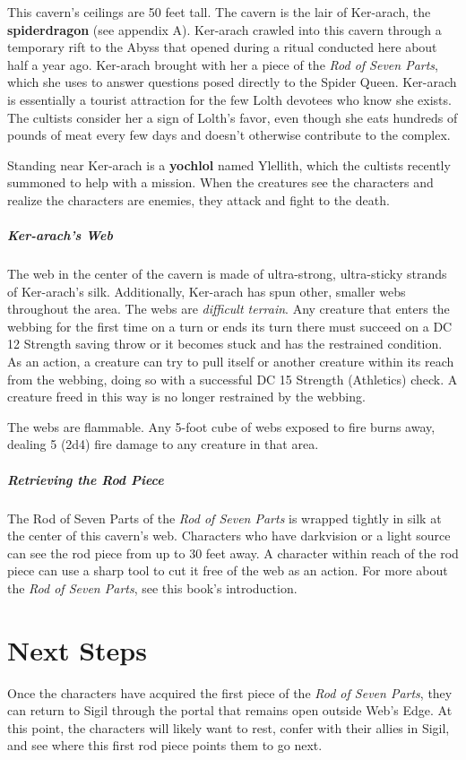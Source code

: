 \documentclass[10pt,a4paper,twoside,bg=print,twocolumn,openany,nodeprecatedcode]{dndbook}
\begin{document}
This cavern's ceilings are 50 feet tall. The cavern is the lair of Ker-arach, the \textbf{spiderdragon} (see appendix A). Ker-arach crawled into this cavern through a temporary rift to the Abyss that opened during a ritual conducted here about half a year ago. Ker-arach brought with her a piece of the \textit{Rod of Seven Parts}, which she uses to answer questions posed directly to the Spider Queen. Ker-arach is essentially a tourist attraction for the few Lolth devotees who know she exists. The cultists consider her a sign of Lolth's favor, even though she eats hundreds of pounds of meat every few days and doesn't otherwise contribute to the complex.

Standing near Ker-arach is a \textbf{yochlol} named Ylellith, which the cultists recently summoned to help with a mission. When the creatures see the characters and realize the characters are enemies, they attack and fight to the death.

\subparagraph{Ker-arach's Web}
The web in the center of the cavern is made of ultra-strong, ultra-sticky strands of Ker-arach's silk. Additionally, Ker-arach has spun other, smaller webs throughout the area. The webs are \textit{difficult terrain}. Any creature that enters the webbing for the first time on a turn or ends its turn there must succeed on a DC 12 Strength saving throw or it becomes stuck and has the restrained condition. As an action, a creature can try to pull itself or another creature within its reach from the webbing, doing so with a successful DC 15 Strength (Athletics) check. A creature freed in this way is no longer restrained by the webbing.

The webs are flammable. Any 5-foot cube of webs exposed to fire burns away, dealing 5 (2d4) fire damage to any creature in that area.

\subparagraph{Retrieving the Rod Piece}
The Rod of Seven Parts of the \textit{Rod of Seven Parts} is wrapped tightly in silk at the center of this cavern's web. Characters who have darkvision or a light source can see the rod piece from up to 30 feet away. A character within reach of the rod piece can use a sharp tool to cut it free of the web as an action. For more about the \textit{Rod of Seven Parts}, see this book's introduction.

\section{Next Steps}
Once the characters have acquired the first piece of the \textit{Rod of Seven Parts}, they can return to Sigil through the portal that remains open outside Web's Edge. At this point, the characters will likely want to rest, confer with their allies in Sigil, and see where this first rod piece points them to go next.
\end{document}

